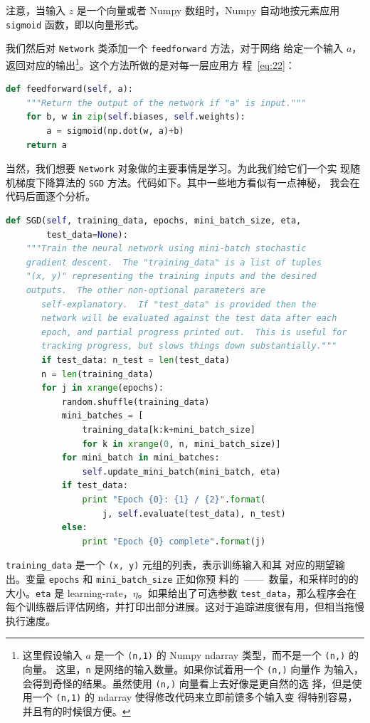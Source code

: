 注意，当输入 $z$ 是一个向量或者 Numpy 数组时，Numpy 自动地按元素应用
\lstinline!sigmoid! 函数，即以向量形式。

我们然后对 \lstinline!Network! 类添加一个 \lstinline!feedforward! 方法，对于网络
给定一个输入 $a$，返回对应的输出\footnote{这里假设输入 $a$ 是一个
  \lstinline!(n,1)! 的 Numpy ndarray 类型，而不是一个 \lstinline!(n,)! 的向量。
  这里，\lstinline!n! 是网络的输入数量。如果你试着用一个 \lstinline!(n,)! 向量作
  为输入，会得到奇怪的结果。虽然使用 \lstinline!(n,)! 向量看上去好像是更自然的选
  择，但是使用一个 \lstinline!(n,1)! 的 ndarray 使得修改代码来立即前馈多个输入变
  得特别容易，并且有的时候很方便。}。这个方法所做的是对每一层应用方
程~\eqref{eq:22}：
\begin{lstlisting}[language=Python]
def feedforward(self, a):
    """Return the output of the network if "a" is input."""
    for b, w in zip(self.biases, self.weights):
        a = sigmoid(np.dot(w, a)+b)
    return a
\end{lstlisting}

当然，我们想要 \lstinline!Network! 对象做的主要事情是学习。为此我们给它们一个实
现随机梯度下降算法的 \lstinline!SGD! 方法。代码如下。其中一些地方看似有一点神秘，
我会在代码后面逐个分析。
\begin{lstlisting}[language=Python]
def SGD(self, training_data, epochs, mini_batch_size, eta,
        test_data=None):
    """Train the neural network using mini-batch stochastic
    gradient descent.  The "training_data" is a list of tuples
    "(x, y)" representing the training inputs and the desired
    outputs.  The other non-optional parameters are
       self-explanatory.  If "test_data" is provided then the
       network will be evaluated against the test data after each
       epoch, and partial progress printed out.  This is useful for
       tracking progress, but slows things down substantially."""
       if test_data: n_test = len(test_data)
       n = len(training_data)
       for j in xrange(epochs):
           random.shuffle(training_data)
           mini_batches = [
               training_data[k:k+mini_batch_size]
               for k in xrange(0, n, mini_batch_size)]
           for mini_batch in mini_batches:
               self.update_mini_batch(mini_batch, eta)
           if test_data:
               print "Epoch {0}: {1} / {2}".format(
                   j, self.evaluate(test_data), n_test)
           else:
               print "Epoch {0} complete".format(j)
\end{lstlisting}

\lstinline!training_data! 是一个 \lstinline!(x, y)! 元组的列表，表示训练输入和其
对应的期望输出。变量 \lstinline!epochs! 和 \lstinline!mini_batch_size! 正如你预
料的~——~\epochs{}数量，和采样时的\minibatch{}的大小。\lstinline!eta! 是%
\gls*{learning-rate}，$\eta$。如果给出了可选参数 \lstinline!test_data!，那么程序会在
每个训练器后评估网络，并打印出部分进展。这对于追踪进度很有用，但相当拖慢执行速度。

